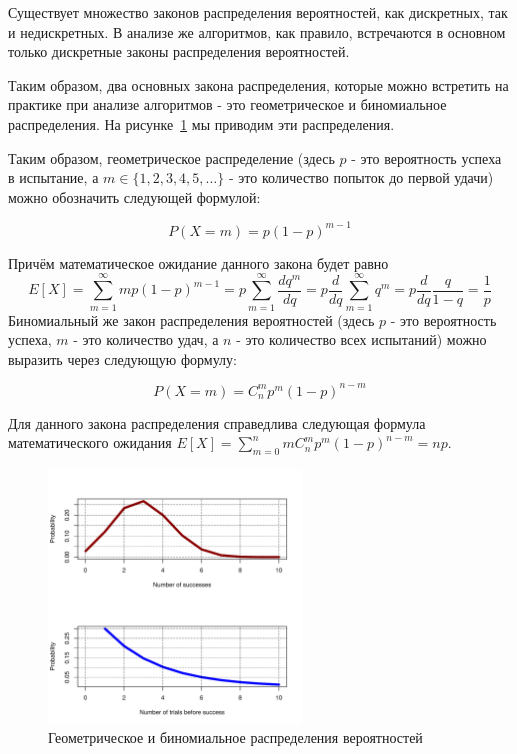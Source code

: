 Существует множество законов распределения вероятностей, как дискретных, 
так и недискретных. В анализе же алгоритмов, как правило, встречаются
в основном только дискретные законы распределения вероятностей.

Таким образом, два основных закона распределения, которые можно встретить на практике
при анализе алгоритмов - это геометрическое и биномиальное распределения.
На рисунке~\ref{fig:distributions} мы приводим эти распределения.

Таким образом, геометрическое распределение (здесь $p$ - это 
вероятность успеха в испытание, а $m \in \{1, 2, 3, 4, 5, \ldots\}$ - это 
количество попыток до первой удачи) можно обозначить следующей 
формулой:

$$P(X=m)=p(1-p)^{m-1}$$

Причём математическое ожидание данного закона будет равно 
$$E[X]=\sum_{m=1}^\infty m p(1-p)^{m-1}=
p\sum_{m=1}^\infty \frac{dq^{m}}{dq}=
p\frac{d}{dq}\sum_{m=1}^\infty q^{m}=
p\frac{d}{dq} \frac{q}{1-q}=
\frac{1}{p}$$
Биномиальный же закон распределения вероятностей (здесь $p$ - это вероятность успеха, 
$m$ - это количество удач, а $n$ - это количество всех испытаний) можно выразить через 
следующую формулу:

$$P(X=m)=C^m_np^{m}(1-p)^{n-m}$$

Для данного закона распределения справедлива следующая формула математического 
ожидания $E[X]=\sum_{m=0}^n mC^m_np^{m}(1-p)^{n-m} = np$.

\begin{figure}[h!]
\centering
\includegraphics[width=0.6\textwidth]{graphics/distributions.pdf}
\caption{Геометрическое и биномиальное распределения вероятностей}
\label{fig:distributions}
\end{figure}


